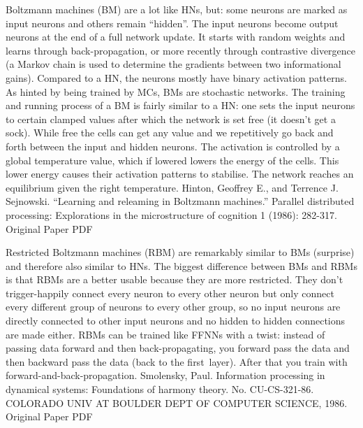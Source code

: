 \documentclass[11pt,a4paper,oneside]{ctexbook}
\begin{document}
Boltzmann machines (BM) are a lot like HNs, but: some neurons are marked as input neurons and others remain “hidden”. The input neurons become output neurons at the end of a full network update. It starts with random weights and learns through back-propagation, or more recently through contrastive divergence (a Markov chain is used to determine the gradients between two informational gains). Compared to a HN, the neurons mostly have binary activation patterns. As hinted by being trained by MCs, BMs are stochastic networks. The training and running process of a BM is fairly similar to a HN: one sets the input neurons to certain clamped values after which the network is set free (it doesn’t get a sock). While free the cells can get any value and we repetitively go back and forth between the input and hidden neurons. The activation is controlled by a global temperature value, which if lowered lowers the energy of the cells. This lower energy causes their activation patterns to stabilise. The network reaches an equilibrium given the right temperature.
Hinton, Geoffrey E., and Terrence J. Sejnowski. “Learning and releaming in Boltzmann machines.” Parallel distributed processing: Explorations in the microstructure of cognition 1 (1986): 282-317.
Original Paper PDF


Restricted Boltzmann machines (RBM) are remarkably similar to BMs (surprise) and therefore also similar to HNs. The biggest difference between BMs and RBMs is that RBMs are a better usable because they are more restricted. They don’t trigger-happily connect every neuron to every other neuron but only connect every different group of neurons to every other group, so no input neurons are directly connected to other input neurons and no hidden to hidden connections are made either. RBMs can be trained like FFNNs with a twist: instead of passing data forward and then back-propagating, you forward pass the data and then backward pass the data (back to the first layer). After that you train with forward-and-back-propagation.
Smolensky, Paul. Information processing in dynamical systems: Foundations of harmony theory. No. CU-CS-321-86. COLORADO UNIV AT BOULDER DEPT OF COMPUTER SCIENCE, 1986.
Original Paper PDF
\end{document}

